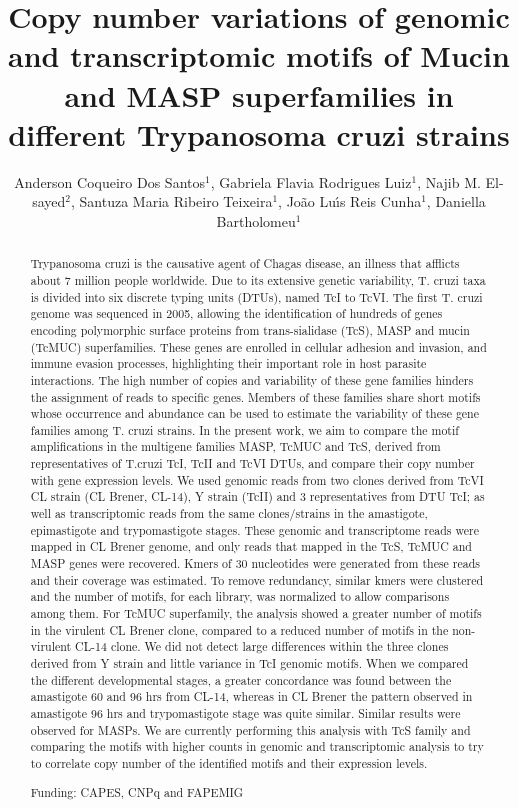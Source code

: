 \documentclass[twoside]{article}
\title{\vspace{-15mm}\fontsize{24pt}{10pt}\selectfont\textbf{Copy number variations of genomic and transcriptomic motifs of Mucin and MASP superfamilies in different Trypanosoma cruzi strains}} %
\author{Anderson Coqueiro Dos Santos$^1$, Gabriela Flavia Rodrigues Luiz$^1$, Najib M. El-sayed$^2$, Santuza Maria Ribeiro Teixeira$^1$, Jo\~ao Lu\'{\i}s Reis Cunha$^1$, Daniella Bartholomeu$^1$}
\affil{1 INSTITUTE OF BIOLOGICAL SCIENCES, UFMG\\ 2 DEPARTMENT OF PARASITE GENOMICS, INSTITUTE FOR GENOMIC RESEARCH\\ }
\date{}
\begin{document}
\maketitle %

\thispagestyle{fancy} %


\begin{abstract}
Trypanosoma cruzi is the causative agent of Chagas disease, an illness that afflicts about 7 million people worldwide. Due to its extensive genetic variability, T. cruzi taxa is divided into six discrete typing units (DTUs), named TcI to TcVI. The first T. cruzi genome was sequenced in 2005, allowing the identification of hundreds of genes encoding polymorphic surface proteins from trans-sialidase (TcS), MASP and mucin (TcMUC) superfamilies. These genes are enrolled in cellular adhesion and invasion, and immune evasion processes, highlighting their important role in host parasite interactions.  The high number of copies and variability of these gene families hinders the assignment of reads to specific genes. Members of these families share short motifs whose occurrence and abundance can be used to estimate the variability of these gene families among T. cruzi strains. In the present work, we aim to compare the motif amplifications in the multigene families MASP, TcMUC and TcS, derived from representatives of T.cruzi TcI, TcII and TcVI DTUs, and compare their copy number with gene expression levels. We used genomic reads from two clones derived from TcVI CL strain (CL Brener, CL-14), Y strain (TcII) and 3 representatives from DTU TcI; as well as transcriptomic reads from the same clones/strains in the amastigote, epimastigote and trypomastigote stages. These genomic and transcriptome reads were mapped in CL Brener genome, and only reads that mapped in the TcS, TcMUC and MASP genes were recovered. Kmers of 30 nucleotides were generated from these reads and their coverage was estimated. To remove redundancy, similar kmers were clustered and the number of motifs, for each library, was normalized to allow comparisons among them. For TcMUC superfamily, the analysis showed a greater number of motifs in the virulent CL Brener clone, compared to a reduced number of motifs in the non-virulent CL-14 clone. We did not detect large differences within the three clones derived from Y strain and little variance in TcI genomic motifs. When we compared the different developmental stages, a greater concordance was found between the amastigote 60 and 96 hrs from CL-14, whereas in CL Brener the pattern observed in amastigote 96 hrs and trypomastigote stage was quite similar. Similar results were observed for MASPs. We are currently performing this analysis with TcS family and comparing the motifs with higher counts in genomic and transcriptomic analysis to try to correlate copy number of the identified motifs and their expression levels.

Funding: CAPES, CNPq and FAPEMIG
\end{abstract}
\end{document}
